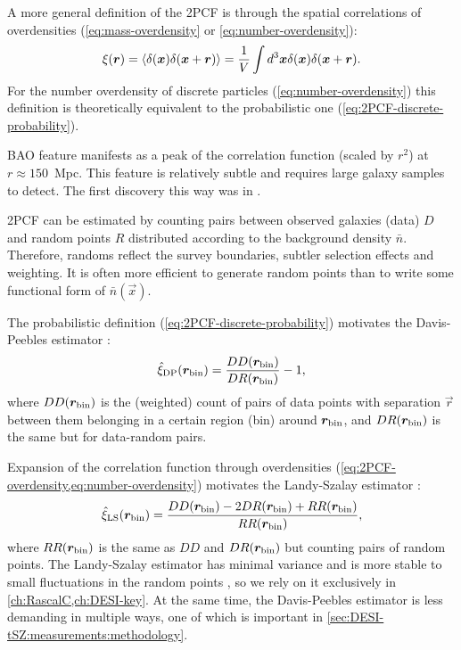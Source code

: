 A more general definition of the 2PCF is through the spatial correlations of overdensities (\cref{eq:mass-overdensity} or \cref{eq:number-overdensity}):
\begin{equation}
    \xi \qty(\vec r) = \ev{\delta \qty(\vec x) \delta \qty(\vec x + \vec r)} = \frac1V \int d^3 \vec x \delta \qty(\vec x) \delta \qty(\vec x + \vec r). \label{eq:2PCF-overdensity}
\end{equation}
For the number overdensity of discrete particles (\cref{eq:number-overdensity}) this definition is theoretically equivalent to the probabilistic one (\cref{eq:2PCF-discrete-probability}).

BAO feature manifests as a peak of the correlation function (scaled by $r^2$) at $r\approx 150$~Mpc. %
This feature is relatively subtle and requires large galaxy samples to detect.
The first discovery this way was in \cite{BAO-discovery-Eisenstein-et-al}.

2PCF can be estimated by counting pairs between observed galaxies (data) $D$ and random points $R$  distributed according to the background density $\bar n$.
Therefore, randoms reflect the survey boundaries, subtler selection effects and weighting.
It is often more efficient to generate random points than to write some functional form of $\bar n(\vec x)$.

The probabilistic definition (\cref{eq:2PCF-discrete-probability}) motivates the Davis-Peebles estimator \citep{Davis-Peebles}:
\begin{equation}
    \hat \xi_{\rm DP} \qty(\vec r_{\rm bin}) = \frac{DD\qty(\vec r_{\rm bin})}{DR\qty(\vec r_{\rm bin})} - 1,
\end{equation}
where $DD\qty(\vec r_{\rm bin})$ is the (weighted) count of pairs of data points with separation $\vec r$ between them belonging in a certain region (bin) around $\vec r_{\rm bin}$, and $DR\qty(\vec r_{\rm bin})$ is the same but for data-random pairs.

Expansion of the correlation function through overdensities (\cref{eq:2PCF-overdensity,eq:number-overdensity}) motivates the Landy-Szalay estimator \citep{Landy-Szalay}:
\begin{equation}
    \hat \xi_{\rm LS} \qty(\vec r_{\rm bin}) = \frac{DD\qty(\vec r_{\rm bin}) - 2 DR\qty(\vec r_{\rm bin}) + RR\qty(\vec r_{\rm bin})}{RR\qty(\vec r_{\rm bin})},
\end{equation}
where $RR\qty(\vec r_{\rm bin})$ is the same as $DD$ and $DR\qty(\vec r_{\rm bin})$ but counting pairs of random points.
The Landy-Szalay estimator has minimal variance and is more stable to small fluctuations in the random points \citep{2PCF-estimator-comparison-Kerscher}, so we rely on it exclusively in \cref{ch:RascalC,ch:DESI-key}.
At the same time, the Davis-Peebles estimator is less demanding in multiple ways, one of which is important in \cref{sec:DESI-tSZ:measurements:methodology}.

